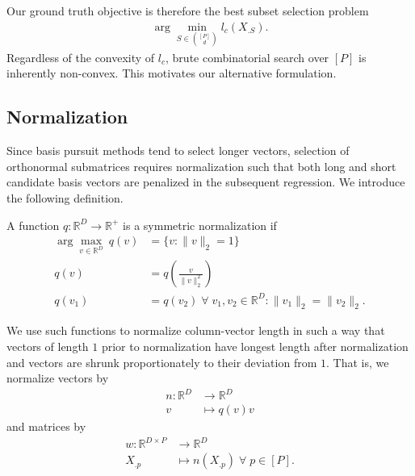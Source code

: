 Our ground truth objective is therefore the best subset selection problem
\begin{align}
\label{prog:ground_truth}
\arg \min_{ S \in \binom{[P]}{d}} l_c ( X_{. S}).
\end{align}
Regardless of the convexity of $l_c$, brute combinatorial search over $[P]$ is inherently non-convex.
This motivates our alternative formulation.

\subsection{Normalization}
\label{sec:normalization}

Since basis pursuit methods tend to select longer vectors, selection of orthonormal submatrices requires normalization such that both long and short candidate basis vectors are penalized in the subsequent regression.
We introduce the following definition.

\begin{definition}
A function $q: \mathbb R^D \to \mathbb R^+ $ is a symmetric normalization if 
\begin{align}
\arg \max_{v \in \mathbb R^D} \ q (v) &=\{ v : \|v\|_2 = 1 \} \\
q(v) &= q(\frac{v}{\|v\|_2^2}) \\
q(v_1) &= q(v_2) \; \forall \; v_1, v_2 \in \mathbb R^D : \|v_1\|_2 = \|v_2\|_2.
\end{align} \label{def:symmetric_normalization}
\end{definition}

We use such functions to normalize column-vector length in such a way that vectors of length $1$ prior to normalization have longest length after normalization and vectors are shrunk proportionately to their deviation from $1$. 
That is, we normalize vectors by 
\begin{align}
n: \mathbb R^D  &\to \mathbb R^D \\
v &\mapsto {q(v) }v
\end{align}
and matrices by
\begin{align}
w: \mathbb R^{D \times P}  &\to \mathbb R^D \\
 X_{.p} &\mapsto n( X_{.p}) \; \forall \; p \in [P].
\end{align}

